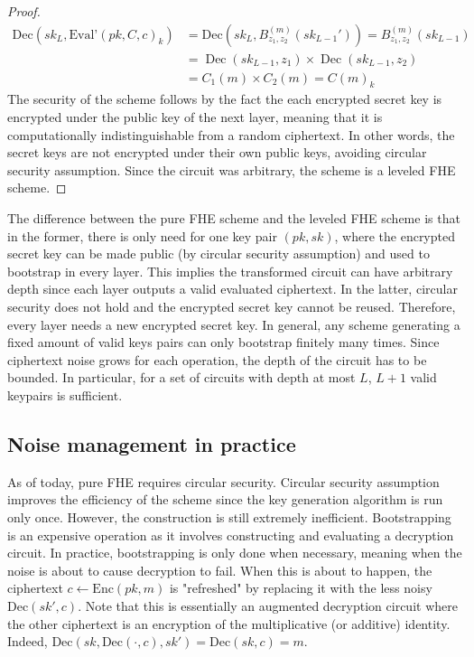 \begin{proof}
\begin{equation*}
    \begin{aligned}
    \text{Dec}(sk_L, \text{Eval'}(pk, C, c)_k) &= \text{Dec}(sk_L, B_{z_1,z_2}^{(m)}(sk_{L-1}')) = B_{z_1,z_2}^{(m)}(sk_{L-1}) \\
    &= \operatorname{Dec}(sk_{L-1}, z_1) \times \operatorname{Dec}(sk_{L-1}, z_2) \\
    &= C_1(m) \times C_2(m) = C(m)_k
    \end{aligned}
\end{equation*}
The security of the scheme follows by the fact the each encrypted secret key is encrypted under the public key of the next layer, meaning that it is computationally indistinguishable from a random ciphertext. In other words, the secret keys are not encrypted under their own public keys, avoiding circular security assumption. Since the circuit was arbitrary, the scheme is a leveled FHE scheme.
\end{proof}

The difference between the pure FHE scheme and the leveled FHE scheme is that in the former, there is only need for one key pair $(pk,sk)$, where the encrypted secret key can be made public (by circular security assumption) and used to bootstrap in every layer. This implies the transformed circuit can have arbitrary depth since each layer outputs a valid evaluated ciphertext. In the latter, circular security does not hold and the encrypted secret key cannot be reused. Therefore, every layer needs a new encrypted secret key. In general, any scheme generating a fixed amount of valid keys pairs can only bootstrap finitely many times. Since ciphertext noise grows for each operation, the depth of the circuit has to be bounded. In particular, for a set of circuits with depth at most $L$, $L+1$ valid keypairs is sufficient.

\subsection*{Noise management in practice}
As of today, pure FHE requires circular security. Circular security assumption improves the efficiency of the scheme since the key generation algorithm is run only once. However, the construction is still extremely inefficient. Bootstrapping is an expensive operation as it involves constructing and evaluating a decryption circuit. In practice, bootstrapping is only done when necessary, meaning when the noise is about to cause decryption to fail. When this is about to happen, the ciphertext $c \leftarrow \text{Enc}(pk, m)$ is "refreshed" by replacing it with the less noisy $\text{Dec}(sk',c)$. Note that this is essentially an augmented decryption circuit where the other ciphertext is an encryption of the multiplicative (or additive) identity. Indeed, $\text{Dec}(sk,\text{Dec}(\cdot,c), sk') = \text{Dec}(sk,c) = m$.

